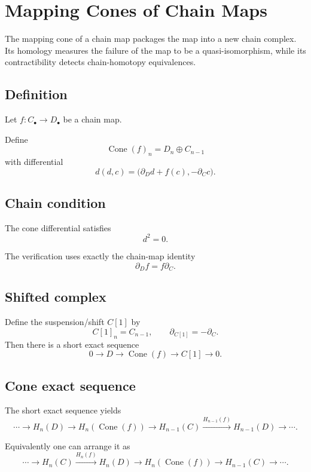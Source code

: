 ﻿\chapter{Mapping Cones of Chain Maps}
\label{ch:viii24-mapping-cones-chain-maps}

The mapping cone of a chain map packages the map into a new chain complex.
Its homology measures the failure of the map to be a quasi-isomorphism, while
its contractibility detects chain-homotopy equivalences.

\section{Definition}
Let \(f:C_\bullet\to D_\bullet\) be a chain map.

\begin{definition}
\label{def:viii24-cone}
Define
\[
\operatorname{Cone}(f)_n=D_n\oplus C_{n-1}
\]
with differential
\[
d(d,c)=\bigl(\partial_Dd+f(c),-\partial_Cc\bigr).
\]
\end{definition}

\section{Chain condition}
\begin{proposition}
\label{prop:viii24-square-zero}
The cone differential satisfies
\[
d^2=0.
\]
\end{proposition}

The verification uses exactly the chain-map identity
\[
\partial_Df=f\partial_C.
\]

\section{Shifted complex}
Define the suspension/shift \(C[1]\) by
\[
C[1]_n=C_{n-1},
\qquad
\partial_{C[1]}=-\partial_C.
\]
Then there is a short exact sequence
\[
0\to D\to\operatorname{Cone}(f)\to C[1]\to0.
\]

\section{Cone exact sequence}
The short exact sequence yields
\[
\cdots\to
H_n(D)\to
H_n(\operatorname{Cone}(f))
\to
H_{n-1}(C)
\xrightarrow{H_{n-1}(f)}
H_{n-1}(D)
\to\cdots.
\]

Equivalently one can arrange it as
\[
\cdots\to H_n(C)\xrightarrow{H_n(f)}H_n(D)
\to H_n(\operatorname{Cone}(f))
\to H_{n-1}(C)\to\cdots.
\]

